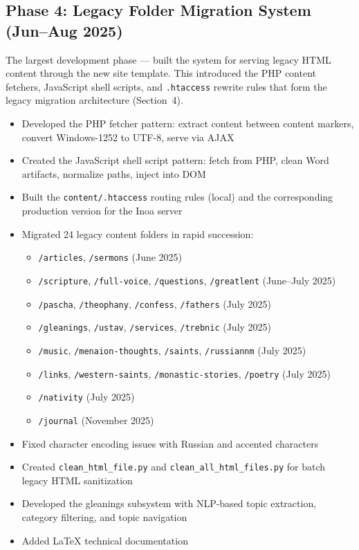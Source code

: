\documentclass[12pt]{article}
\begin{document}
\subsection{Phase 4: Legacy Folder Migration System (Jun--Aug 2025)}

The largest development phase --- built the system for serving legacy HTML content through the new site template. This introduced the PHP content fetchers, JavaScript shell scripts, and \texttt{.htaccess} rewrite rules that form the legacy migration architecture (Section~4).

\begin{itemize}
    \item Developed the PHP fetcher pattern: extract content between content markers, convert Windows-1252 to UTF-8, serve via AJAX
    \item Created the JavaScript shell script pattern: fetch from PHP, clean Word artifacts, normalize paths, inject into DOM
    \item Built the \texttt{content/.htaccess} routing rules (local) and the corresponding production version for the Inoa server
    \item Migrated 24 legacy content folders in rapid succession:
    \begin{itemize}
        \item \texttt{/articles}, \texttt{/sermons} (June 2025)
        \item \texttt{/scripture}, \texttt{/full-voice}, \texttt{/questions}, \texttt{/greatlent} (June--July 2025)
        \item \texttt{/pascha}, \texttt{/theophany}, \texttt{/confess}, \texttt{/fathers} (July 2025)
        \item \texttt{/gleanings}, \texttt{/ustav}, \texttt{/services}, \texttt{/trebnic} (July 2025)
        \item \texttt{/music}, \texttt{/menaion-thoughts}, \texttt{/saints}, \texttt{/russiannm} (July 2025)
        \item \texttt{/links}, \texttt{/western-saints}, \texttt{/monastic-stories}, \texttt{/poetry} (July 2025)
        \item \texttt{/nativity} (July 2025)
        \item \texttt{/journal} (November 2025)
    \end{itemize}
    \item Fixed character encoding issues with Russian and accented characters
    \item Created \texttt{clean\_html\_file.py} and \texttt{clean\_all\_html\_files.py} for batch legacy HTML sanitization
    \item Developed the gleanings subsystem with NLP-based topic extraction, category filtering, and topic navigation
    \item Added LaTeX technical documentation
\end{itemize}
\end{document}
